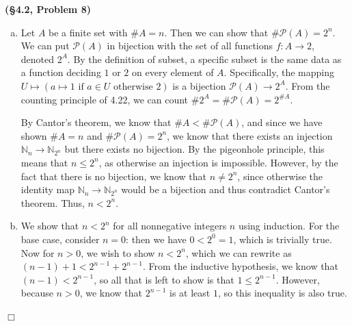 \documentclass[12pt]{article}
\theoremstyle{definition}
\newenvironment{Solution}{\noindent {\sc Solution.}}{$\Box$ \vspace{2 ex}}
\begin{document}
\begin{Solution}
{\bf (\S4.2, Problem 8)}\\
\begin{enumerate}[(a)]
\item Let $A$ be a finite set with $\#A = n$. Then we can show that $\#\mathcal P(A) = 2^n$. We can put $\mathcal P(A)$ in bijection with the set of all functions $f:A \to 2$, denoted $2^A$. By the definition of subset, a specific subset is the same data as a function deciding $1$ or $2$ on every element of $A$. Specifically, the mapping $U \mapsto (a \mapsto 1 \text{ if } a \in U \text{ otherwise } 2)$ is a bijection $\mathcal P(A) \to 2^A$. From the counting principle of 4.22, we can count $\#2^A = \#\mathcal P(A)= 2^{\# A}$.

By Cantor's theorem, we know that $\# A < \# \mathcal P(A)$, and since we have shown $\# A = n$ and $\#\mathcal P(A) = 2^n$, we know that there exists an injection $\mathbb N_n \to \mathbb N_{2^n}$ but there exists no bijection. By the pigeonhole principle, this means that $n \le 2^n$, as otherwise an injection is impossible. However, by the fact that there is no bijection, we know that $n \ne 2^n$, since otherwise the identity map $\mathbb N_n \to \mathbb N_{2^n}$ would be a bijection and thus contradict Cantor's theorem. Thus, $n < 2^n$.
\item We show that $n < 2^n$ for all nonnegative integers $n$ using induction. For the base case, consider $n = 0$: then we have $0 < 2^0 = 1$, which is trivially true. Now for $n>0$, we wish to show $n < 2^n$, which we can rewrite as $(n-1)+1 < 2^{n-1} + 2^{n-1}$. From the inductive hypothesis, we know that $(n-1)< 2^{n-1}$, so all that is left to show is that $1 \le 2^{n-1}$. However, because $n>0$, we know that $2^{n-1}$ is at least $1$, so this inequality is also true.
\end{enumerate}
\end{Solution}

\vspace{0.5cm}
\end{document}
